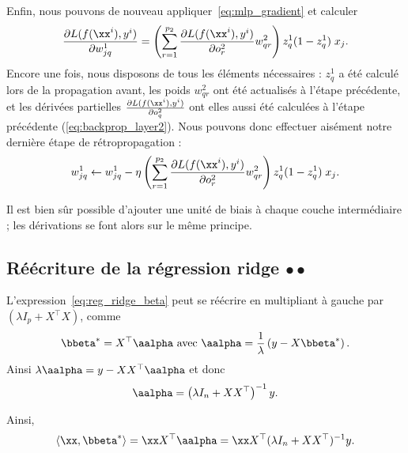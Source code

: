 \begin{exemple}
  Enfin, nous pouvons de nouveau appliquer~\ref{eq:mlp_gradient} et calculer 
  \begin{equation*}
    \frac{\partial L(f(\xx^i), y^i)}{\partial w^1_{jq}} =  
    \left(\sum_{r=1}^{p_2}  \frac{\partial L(f(\xx^i), y^i)}{\partial o^2_r}  
      w^2_{qr} \right) z^1_q (1 - z^1_q) \; x_j.
  \end{equation*}
  Encore une fois, nous disposons de tous les éléments nécessaires : $z_q^1$
  a été calculé lors de la propagation avant, les poids $w^2_{qr}$ ont été
  actualisés à l'étape précédente, et les dérivées partielles $\frac{\partial
    L(f(\xx^i), y^i)}{\partial o^2_q}$ ont elles aussi été calculées à
  l'étape précédente (\ref{eq:backprop_layer2}). Nous pouvons donc effectuer
  aisément notre dernière étape de rétropropagation :
  \begin{equation*}
    w^1_{jq} \leftarrow w^1_{jq} - \eta \left(\sum_{r=1}^{p_2}  
      \frac{\partial L(f(\xx^i), y^i)}{\partial o^2_r}  
      w^2_{qr} \right) z^1_q (1 - z^1_q) \; x_j.
  \end{equation*}
\end{exemple}


Il est bien sûr possible d'ajouter une unité de biais à chaque couche intermédiaire
; les dérivations se font alors sur le même principe.


\subsection{Réécriture de la régression ridge $\bullet \bullet$}
\label{sec:ridge_rewrite}

L'expression~\eqref{eq:reg_ridge_beta} peut se réécrire en multipliant à gauche
par $\left( \lambda I_p + X^\top X \right)$, comme
\begin{equation*}
  \bbeta^* = X^\top \aalpha \text{ avec }
  \aalpha = \frac1{\lambda} \left(y - X \bbeta^* \right).
\end{equation*}
Ainsi $\lambda \aalpha = y - X X^\top \aalpha$ et donc 
\begin{equation*}
  \aalpha = \left(\lambda I_n + X X^\top \right)^{-1} y.
\end{equation*}

Ainsi, 
\begin{equation*}
  \langle \xx,  \bbeta^* \rangle = \xx X^\top \aalpha = \xx X^\top (\lambda I_n + XX^\top)^{-1} y.
\end{equation*}



